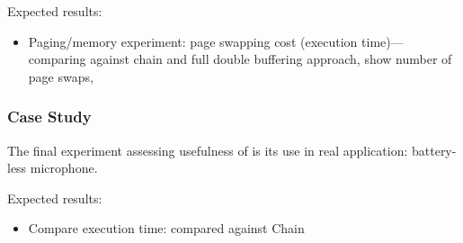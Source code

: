 Expected results:
\begin{itemize}
	\item Paging/memory experiment: page swapping cost (execution time)---comparing against chain and full double buffering approach, show number of page swaps,
\end{itemize} 


\subsubsection{Case Study}
\label{sec:case_study}

The final experiment assessing usefulness of \sys is its use in real application: battery-less microphone.

Expected results:
\begin{itemize}
	\item Compare execution time: \sys compared against Chain
\end{itemize}
 

